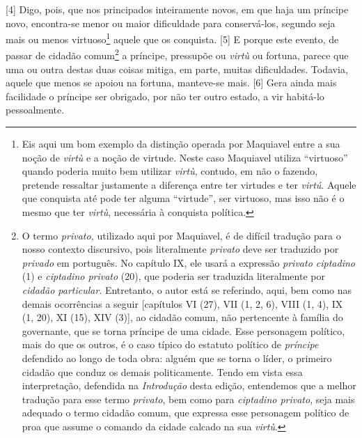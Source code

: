 {[}4{]} Digo, pois, que nos principados inteiramente novos, em que haja
um príncipe novo, encontra-se menor ou maior dificuldade para
conservá-los, segundo seja mais ou menos virtuoso\footnote{Eis aqui um
  bom exemplo da distinção operada por Maquiavel entre a sua noção de
  \emph{virtù} e a noção de virtude. Neste caso Maquiavel utiliza
  ``virtuoso'' quando poderia muito bem utilizar \emph{virtù}, contudo,
  em não o fazendo, pretende ressaltar justamente a diferença entre ter
  virtudes e ter \emph{virtú}. Aquele que conquista até pode ter alguma
  ``virtude'', ser virtuoso, mas isso não é o mesmo que ter
  \emph{virtù}, necessária à conquista política.} aquele que os
conquista. {[}5{]} E porque este evento, de passar de cidadão
comum\footnote{O termo \emph{privato,} utilizado aqui por Maquiavel, é
  de difícil tradução para o nosso contexto discursivo, pois
  literalmente \emph{privato} deve ser traduzido por \emph{privado} em
  português. No capítulo IX, ele usará a expressão \emph{privato
  ciptadino} (1) e \emph{ciptadino privato} (20), que poderia ser
  traduzida literalmente por \emph{cidadão particular}. Entretanto, o
  autor está se referindo, aqui, bem como nas demais ocorrências a
  seguir {[}capítulos VI (27), VII (1, 2, 6), VIII (1, 4), IX (1, 20),
  XI (15), XIV (3){]}, ao cidadão comum, não pertencente à família do
  governante, que se torna príncipe de uma cidade. Esse personagem
  político, mais do que os outros, é o caso típico do estatuto político
  de \emph{príncipe} defendido ao longo de toda obra: alguém que se
  torna o líder, o primeiro cidadão que conduz os demais politicamente.
  Tendo em vista essa interpretação, defendida na \emph{Introdução}
  desta edição, entendemos que a melhor tradução para esse termo
  \emph{privato}, bem como para \emph{ciptadino privato}, seja mais
  adequado o termo cidadão comum, que expressa esse personagem político
  de proa que assume o comando da cidade calcado na sua \emph{virtù}.} a
príncipe, pressupõe ou \emph{virtù} ou fortuna, parece que uma ou outra
destas duas coisas mitiga, em parte, muitas dificuldades. Todavia,
aquele que menos se apoiou na fortuna, manteve-se mais. {[}6{]} Gera
ainda mais facilidade o príncipe ser obrigado, por não ter outro estado,
a vir habitá-lo pessoalmente.

